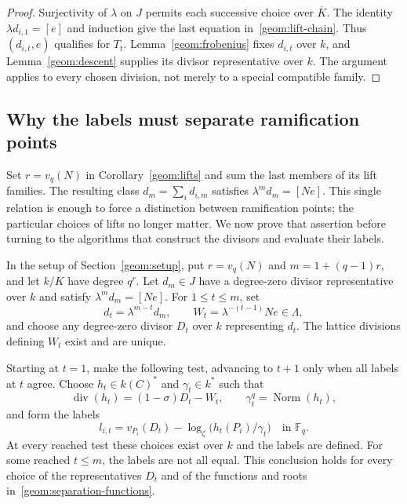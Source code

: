 \begin{proof}
Surjectivity of $\lambda$ on $J$ permits each successive choice over
$\overline K$.  The identity $\lambda d_{i,1}=[e]$ and induction give
the last equation in~\eqref{geom:lift-chain}.
Thus $(d_{i,t},e)$ qualifies for $T_t$.
Lemma~\ref{geom:frobenius} fixes $d_{i,t}$ over $k$, and
Lemma~\ref{geom:descent} supplies its divisor representative over $k$.
The argument applies to every chosen division, not merely to a special
compatible family.
\end{proof}

\subsection{Why the labels must separate ramification points}

Set $r=v_q(N)$ in Corollary~\ref{geom:lifts} and sum the last members of
its lift families.  The resulting class $d_m=\sum_i d_{i,m}$ satisfies
$\lambda^m d_m=[Ne]$.  This single relation is enough to force a
distinction between ramification points; the particular choices of lifts
no longer matter.  We now prove that assertion before turning to the
algorithms that construct the divisors and evaluate their labels.

\begin{proposition}
\label{geom:separation}
In the setup of Section~\ref{geom:setup}, put $r=v_q(N)$ and
$m=1+(q-1)r$, and let $k/K$ have degree $q^r$.
Let $d_m\in J$ have a degree-zero divisor representative over $k$ and
satisfy $\lambda^m d_m=[Ne]$.
For $1\le t\le m$, set
\begin{equation}
           d_t=\lambda^{m-t}d_m,\qquad
           W_t=\lambda^{-(t-1)}Ne\in\Lambda,
\label{geom:separation-data}
\end{equation}
and choose any degree-zero divisor $D_t$ over $k$ representing $d_t$.
The lattice divisions defining $W_t$ exist and are unique.

Starting at $t=1$, make the following test, advancing to $t+1$ only when
all labels at $t$ agree.  Choose $h_t\in k(C)^*$ and $\gamma_t\in k^*$
such that
\begin{equation}
 \operatorname{div}(h_t)=(1-\sigma)D_t-W_t,
       \qquad \gamma_t^q=\operatorname{Norm}(h_t),
\label{geom:separation-functions}
\end{equation}
and form the labels
\begin{equation}
            l_{i,t}=v_{P_i}(D_t)
               -\log_\zeta\bigl(h_t(P_i)/\gamma_t\bigr)
                    \quad\text{in }\mathbb F_q.
\label{geom:separation-labels}
\end{equation}
At every reached test these choices exist over $k$ and the labels are
defined.  For some reached $t\le m$, the labels are not all equal.
This conclusion holds for every choice of the representatives $D_t$ and
of the functions and roots in~\eqref{geom:separation-functions}.
\end{proposition}

